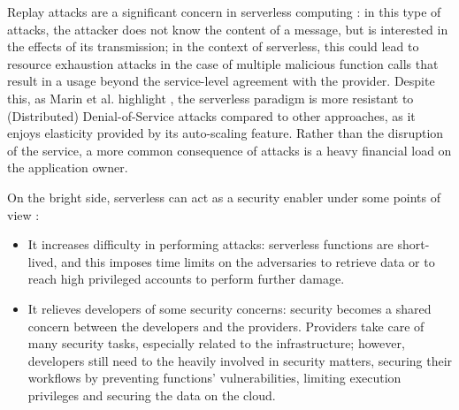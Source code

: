 \documentclass[
	a4paper, %
	12pt,
	twoside, %
]{LTJournalArticle}
\begin{document}
Replay attacks are a significant concern in serverless computing \cite{shafiei_serverless_2022}: in this type of attacks, the attacker does not know the content of a message, but is interested in the effects of its transmission; in the context of serverless, this could lead to resource exhaustion attacks in the case of multiple malicious function calls that result in a usage beyond the service-level agreement with the provider. Despite this, as Marin et al. highlight \cite{marin_serverless_2022}, the serverless paradigm is more resistant to (Distributed) Denial-of-Service attacks compared to other approaches, as it enjoys elasticity provided by its auto-scaling feature. Rather than the disruption of the service, a more common consequence of attacks is a heavy financial load on the application owner.

On the bright side, serverless can act as a security enabler under some points of view \cite{marin_serverless_2022}:
\begin{itemize}
	\item It increases difficulty in performing attacks: serverless functions are short-lived, and this imposes time limits on the adversaries to retrieve data or to reach high privileged accounts to perform further damage.
	\item It relieves developers of some security concerns: security becomes a shared concern between the developers and the providers. Providers take care of many security tasks, especially related to the infrastructure; however, developers still need to the heavily involved in security matters, securing their workflows by preventing functions' vulnerabilities, limiting execution privileges and securing the data on the cloud. 
\end{itemize}
\end{document}
